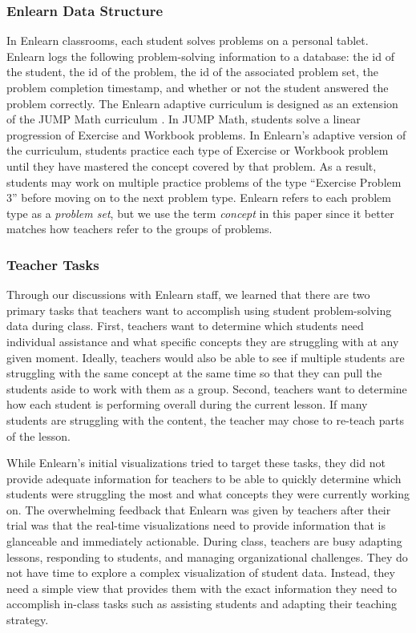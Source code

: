 \documentclass{sigchi}
\begin{document}
\subsubsection{Enlearn Data Structure}
In Enlearn classrooms, each student solves problems on a personal tablet. Enlearn logs the following problem-solving information to a database: the id of the student, the id of the problem, the id of the associated problem set, the problem completion timestamp,  and whether or not the student answered the problem correctly. The Enlearn adaptive curriculum is designed as an extension of the JUMP Math curriculum \cite{JUMPMath}. In JUMP Math, students solve a linear progression of Exercise and Workbook problems. In Enlearn's adaptive version of the curriculum, students practice each type of Exercise or Workbook problem until they have mastered the concept covered by that problem. As a result, students may work on multiple practice problems of the type ``Exercise Problem 3'' before moving on to the next problem type. Enlearn refers to each problem type as a \emph{problem set}, but we use the term \emph{concept} in this paper since it better matches how teachers refer to the groups of problems.

\subsubsection{Teacher Tasks}
Through our discussions with Enlearn staff, we learned that there are two primary tasks that teachers want to accomplish using student problem-solving data during class. First, teachers want to determine which students need individual assistance and what specific concepts they are struggling with at any given moment. Ideally, teachers would also be able to see if multiple students are struggling with the same concept at the same time so that they can pull the students aside to work with them as a group. Second, teachers want to determine how each student is performing overall during the current lesson. If many students are struggling with the content, the teacher may chose to re-teach parts of the lesson.

While Enlearn's initial visualizations tried to target these tasks, they did not provide adequate information for teachers to be able to quickly determine which students were struggling the most and what concepts they were currently working on. The overwhelming feedback that Enlearn was given by teachers after their trial was that the real-time visualizations need to provide information that is glanceable and immediately actionable. During class, teachers are busy adapting lessons, responding to students, and managing organizational challenges. They do not have time to explore a complex visualization of student data. Instead, they need a simple view that provides them with the exact information they need to accomplish in-class tasks such as assisting students and adapting their teaching strategy.
\end{document}
